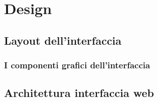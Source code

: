 \chapter{Design}


%

\section{Layout dell'interfaccia}
\subsection{I componenti grafici dell'interfaccia}
\section{Architettura interfaccia web}